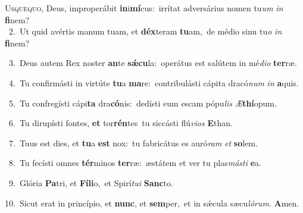 \lettrine{\initial\textcolor{\initialcolor}{U}}{squequo,} Deus, improperábit \textbf{in}\-i\-\textbf{mí}\-cus:~\star irrítat adversárius nomen tu\textit{um} \textit{in} \textbf{fi}\-nem?\\
{\numbfont\textcolor{\numbcolor}{~2.}}~Ut quid avértis manum tuam, et \textbf{déx}\-teram \textbf{tu}\-am,~\star de médio sinu tu\textit{o} \textit{in} \textbf{fi}\-nem?\par
{\numbfont\textcolor{\numbcolor}{~3.}}~Deus autem Rex noster \textbf{an}\-te \textbf{sǽ}\-\textbf{cu}la:~\star operátus est salútem in mé\-\textit{di}\-\textit{o} \textbf{ter}\-ræ.\par
{\numbfont\textcolor{\numbcolor}{~4.}}~Tu confirmásti in virtúte \textbf{tu}\-a \textbf{ma}\-re:~\star contribulásti cápita dracó\textit{num} \textit{in} \textbf{a}\-quis.\par
{\numbfont\textcolor{\numbcolor}{~5.}}~Tu confregísti cápi\textbf{ta} dra\-\textbf{có}\-nis:~\star dedísti eum escam pópu\textit{lis} \textit{Æ}\-\textbf{thí}opum.\par
{\numbfont\textcolor{\numbcolor}{~6.}}~Tu dirupísti fontes, \textbf{et} tor\-\textbf{rén}\-tes~\star tu siccásti flú\-\textit{vi}\-\textit{os} \textbf{E}\-than.\par
{\numbfont\textcolor{\numbcolor}{~7.}}~Tuus est dies, et \textbf{tu}\-a \textbf{est} nox:~\star tu fabricátus es auró\textit{ram} \textit{et} \textbf{so}\-lem.\par
{\numbfont\textcolor{\numbcolor}{~8.}}~Tu fecísti omnes \textbf{tér}\-minos \textbf{ter}\-ræ:~\star æstátem et ver tu plas\-\textit{más}\-\textit{ti} \textbf{e}\-a.\par
{\numbfont\textcolor{\numbcolor}{~9.}}~Glória \textbf{Pa}\-tri, et \textbf{Fí}\-\textbf{li}o,~\star et Spirí\-\textit{tu}\-\textit{i} \textbf{Sanc}\-to.\par
{\numbfont\textcolor{\numbcolor}{10.}}~Sicut erat in princípio, et \textbf{nunc}\-, et \textbf{sem}\-per,~\star et in sǽcula sæcu\-\textit{ló}\-\textit{rum}. \textbf{A}\-men.\par
